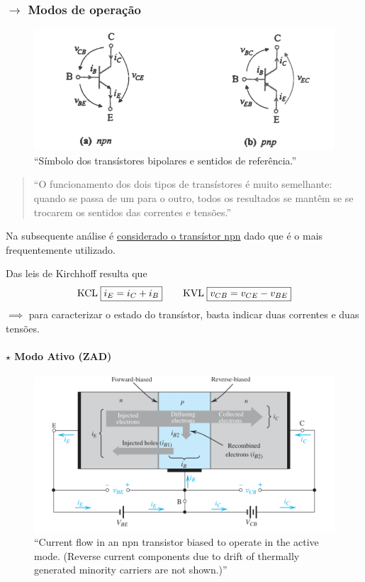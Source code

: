 \subsubsection[3.1.1 Modos de operação]{$\pmb{\rightarrow}$ Modos de operação}

\begin{figure}[H]
    \centering
    \includegraphics[width=0.7\linewidth]{img/3/BJT/BJT-symbol.png}
    \caption{``Símbolo dos transístores bipolares e sentidos de referência.''\cite{medeiros:CTBM}}
    \label{fig:BJT-symbol}
\end{figure}

\begin{quote}
    ``O funcionamento dos dois tipos de transístores é muito semelhante: quando se passa de um para o outro, todos os resultados se mantêm se se trocarem os sentidos das correntes e tensões.''\cite{medeiros:CTBM} 
\end{quote}

\noindent Na subsequente análise é \underline{considerado o transístor npn} dado que é o mais frequentemente utilizado.

\vspace{0.5em}
\noindent Das leis de Kirchhoff resulta que
$$
    \text{KCL}\; \boxed{ i_E = i_C + i_B } \mkern38mu \text{KVL}\; \boxed{ v_{CB} = v_{CE} - v_{BE} }
$$
$\implies$ para caracterizar o estado do transístor, basta indicar duas correntes e duas tensões.

\paragraph[3.1.1.1 Modo Ativo (ZAD)]{$\pmb{\star}$ Modo Ativo (ZAD)}\mbox{}

\begin{figure}[H]
    \centering
    \includegraphics[width=0.75\linewidth]{img/3/BJT/active-mode.png}
    \caption{``Current flow in an npn transistor biased to operate in the active mode. (Reverse current
components due to drift of thermally generated minority carriers are not shown.)''\cite{sedra-smith:microelectronic-circuits}}
    \label{fig:active-mode}
\end{figure}

